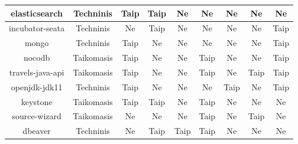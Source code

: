 \begin{figure}[H]
\begin{tabular}{|c|c|c|c|c|c|c|c|c|}
        elasticsearch                   & Techninis                 & Taip                          & Taip                          & Ne                         & Ne                         & Ne                 & Ne                 & Ne                  \\ \hline
        incubator-seata                 & Techninis                 & Ne                            & Taip                          & Ne                         & Ne                         & Ne                 & Ne                 & Taip                \\ \hline
        mongo                           & Techninis                 & Taip                          & Ne                            & Ne                         & Ne                         & Ne                 & Ne                 & Taip                \\ \hline
        nocodb                          & Taikomasis                & Taip                          & Ne                            & Ne                         & Taip                       & Ne                 & Ne                 & Taip                \\ \hline
        travels-java-api                & Taikomasis                & Taip                          & Ne                            & Ne                         & Taip                       & Ne                 & Taip               & Taip                \\ \hline
        openjdk-jdk11                   & Techninis                 & Taip                          & Ne                            & Ne                         & Ne                         & Taip               & Ne                 & Taip                \\ \hline
        keystone                        & Taikomasis                & Taip                          & Taip                          & Ne                         & Taip                       & Ne                 & Ne                 & Ne                  \\ \hline
        source-wizard                   & Taikomasis                & Ne                            & Ne                            & Ne                         & Taip                       & Ne                 & Taip               & Ne                  \\ \hline
        dbeaver                         & Techninis                 & Ne                            & Taip                          & Taip                       & Taip                       & Ne                 & Ne                 & Ne                  \\ \hline

\end{tabular}
\end{figure}
